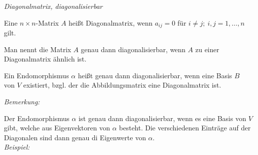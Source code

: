 \begin{mydef} \textit{Diagonalmatrix, diagonalisierbar}

    Eine $n\times n$-Matrix $A$ heißt Diagonalmatrix, wenn $a_{ij}=0$ für $i\neq j; \ i,j=1,\ldots,n$ gilt.

    Man nennt die Matrix $A$ genau dann diagonalisierbar, wenn $A$ zu einer Diagonalmatrix ähnlich ist.

    Ein Endomorphismus $\alpha$ heißt genau dann diagonalisierbar, wenn eine Basis $B$ von $V$ existiert, bzgl. der die Abbildungsmatrix eine Diagonalmatrix ist.
\end{mydef}

\textit{Bemerkung:}\medskip

Der Endomorphismus $\alpha$ ist genau dann diagonalisierbar, wenn es eine Basis von $V$ gibt, welche aus Eigenvektoren von $\alpha$ besteht. Die verschiedenen Einträge auf der Diagonalen sind dann genau di Eigenwerte von $\alpha$.\\

\textit{Beispiel:}\medskip

